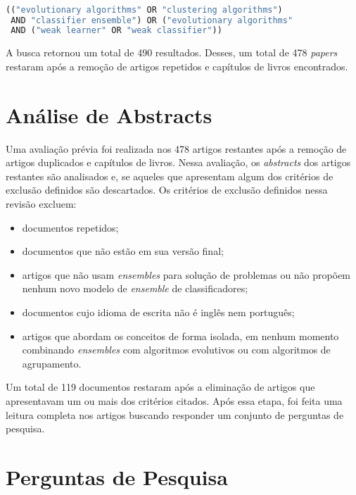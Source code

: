 \documentclass[12pt]{report}
\begin{document}
\begin{lstlisting}[language=Python]

(("evolutionary algorithms" OR "clustering algorithms")
 AND "classifier ensemble") OR ("evolutionary algorithms"
 AND ("weak learner" OR "weak classifier"))

\end{lstlisting}

\bigbreak

A busca retornou um total de 490 resultados. Desses, um total de 478 \textit{papers} restaram após a remoção de artigos repetidos e capítulos de livros encontrados.  

\section{Análise de Abstracts} \label{sec:analise_de_abstracts}

Uma avaliação prévia foi realizada nos 478 artigos restantes após a remoção de artigos duplicados e capítulos de livros. Nessa avaliação, os \textit{abstracts} dos artigos restantes são analisados e, se aqueles que apresentam algum dos critérios de exclusão definidos são descartados. Os critérios de exclusão definidos nessa revisão excluem:

\begin{itemize}
    \item documentos repetidos;
    \item documentos que não estão em sua versão final;
    \item artigos que não usam \textit{ensembles} para solução de problemas ou não propõem nenhum novo modelo de \textit{ensemble} de classificadores;
    \item documentos cujo idioma de escrita não é inglês nem português;
    \item artigos que abordam os conceitos de forma isolada, em nenhum momento combinando \textit{ensembles} com algoritmos evolutivos ou com algoritmos de agrupamento.
\end{itemize}

Um total de 119 documentos restaram após a eliminação de artigos que apresentavam um ou mais dos critérios citados. Após essa etapa, foi feita uma leitura completa nos artigos buscando responder um conjunto de perguntas de pesquisa.

\section{Perguntas de Pesquisa} \label{sec:perguntas_de_pesquisa}
\end{document}
